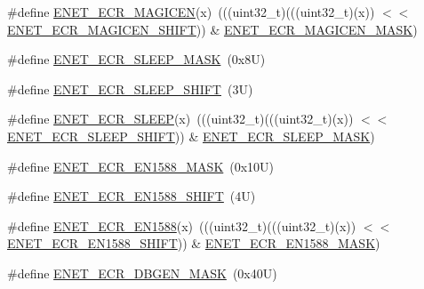 \begin{DoxyCompactItemize}
\item 
\#define \mbox{\hyperlink{group___e_n_e_t___register___masks_ga9c964e79e28159a1242d89a57ae90539}{E\+N\+E\+T\+\_\+\+E\+C\+R\+\_\+\+M\+A\+G\+I\+C\+EN}}(x)~(((uint32\+\_\+t)(((uint32\+\_\+t)(x)) $<$$<$ \mbox{\hyperlink{group___e_n_e_t___register___masks_ga67e75bc314dd2ad2b5c2c5367bde4a2b}{E\+N\+E\+T\+\_\+\+E\+C\+R\+\_\+\+M\+A\+G\+I\+C\+E\+N\+\_\+\+S\+H\+I\+FT}})) \& \mbox{\hyperlink{group___e_n_e_t___register___masks_gac9f26b8af41cbdc78fce749af85c7c31}{E\+N\+E\+T\+\_\+\+E\+C\+R\+\_\+\+M\+A\+G\+I\+C\+E\+N\+\_\+\+M\+A\+SK}})
\item 
\#define \mbox{\hyperlink{group___e_n_e_t___register___masks_gac1e535ecbb3cecb46d9275e29aa275d6}{E\+N\+E\+T\+\_\+\+E\+C\+R\+\_\+\+S\+L\+E\+E\+P\+\_\+\+M\+A\+SK}}~(0x8\+U)
\item 
\#define \mbox{\hyperlink{group___e_n_e_t___register___masks_gaf2e49f4bcbb2769aa54a34eb456ca6e1}{E\+N\+E\+T\+\_\+\+E\+C\+R\+\_\+\+S\+L\+E\+E\+P\+\_\+\+S\+H\+I\+FT}}~(3\+U)
\item 
\#define \mbox{\hyperlink{group___e_n_e_t___register___masks_ga19062aae533ab1d8a1b146c00880d499}{E\+N\+E\+T\+\_\+\+E\+C\+R\+\_\+\+S\+L\+E\+EP}}(x)~(((uint32\+\_\+t)(((uint32\+\_\+t)(x)) $<$$<$ \mbox{\hyperlink{group___e_n_e_t___register___masks_gaf2e49f4bcbb2769aa54a34eb456ca6e1}{E\+N\+E\+T\+\_\+\+E\+C\+R\+\_\+\+S\+L\+E\+E\+P\+\_\+\+S\+H\+I\+FT}})) \& \mbox{\hyperlink{group___e_n_e_t___register___masks_gac1e535ecbb3cecb46d9275e29aa275d6}{E\+N\+E\+T\+\_\+\+E\+C\+R\+\_\+\+S\+L\+E\+E\+P\+\_\+\+M\+A\+SK}})
\item 
\#define \mbox{\hyperlink{group___e_n_e_t___register___masks_gae1ce5dc6adb44fd0791cd21440c18f44}{E\+N\+E\+T\+\_\+\+E\+C\+R\+\_\+\+E\+N1588\+\_\+\+M\+A\+SK}}~(0x10\+U)
\item 
\#define \mbox{\hyperlink{group___e_n_e_t___register___masks_ga35fdd6a1319857e1de70d68c4dd02685}{E\+N\+E\+T\+\_\+\+E\+C\+R\+\_\+\+E\+N1588\+\_\+\+S\+H\+I\+FT}}~(4\+U)
\item 
\#define \mbox{\hyperlink{group___e_n_e_t___register___masks_gae2080c2010771cd92e79d3328f8875b9}{E\+N\+E\+T\+\_\+\+E\+C\+R\+\_\+\+E\+N1588}}(x)~(((uint32\+\_\+t)(((uint32\+\_\+t)(x)) $<$$<$ \mbox{\hyperlink{group___e_n_e_t___register___masks_ga35fdd6a1319857e1de70d68c4dd02685}{E\+N\+E\+T\+\_\+\+E\+C\+R\+\_\+\+E\+N1588\+\_\+\+S\+H\+I\+FT}})) \& \mbox{\hyperlink{group___e_n_e_t___register___masks_gae1ce5dc6adb44fd0791cd21440c18f44}{E\+N\+E\+T\+\_\+\+E\+C\+R\+\_\+\+E\+N1588\+\_\+\+M\+A\+SK}})
\item 
\#define \mbox{\hyperlink{group___e_n_e_t___register___masks_ga0ac795d0ce9073caa7812af08d401bd2}{E\+N\+E\+T\+\_\+\+E\+C\+R\+\_\+\+D\+B\+G\+E\+N\+\_\+\+M\+A\+SK}}~(0x40\+U)
$$
\end{DoxyCompactItemize}
